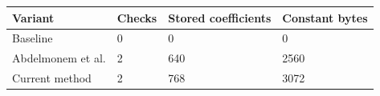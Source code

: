 \begin{tabular}{llll}
\hline
Variant & Checks & Stored coefficients & Constant bytes \\
\hline
Baseline & 0 & 0 & 0 \\
Abdelmonem et al. & 2 & 640 & 2560 \\
Current method & 2 & 768 & 3072 \\
\hline
\end{tabular}
